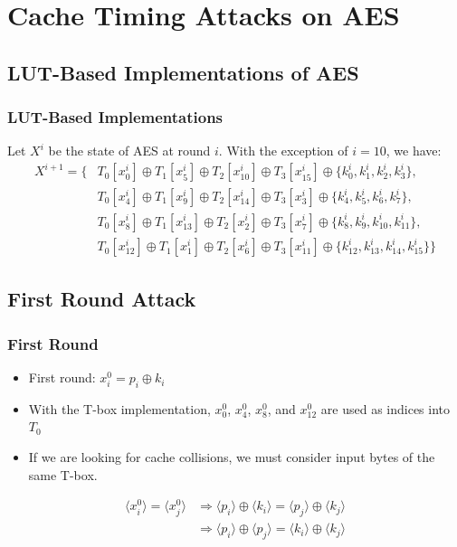 \documentclass[9pt,handout]{beamer}
\begin{document}
\section{Cache Timing Attacks on AES}
\subsection{LUT-Based Implementations of AES}
\begin{frame}
	\frametitle{LUT-Based Implementations}
	Let $X^i$ be the state of AES at round $i$. With the exception of $i = 10$, we have:
\begin{align*}
X^{i+1} = \{ & T_0[x_0^i] \oplus T_1[x_5^i] \oplus T_2[x_{10}^i] \oplus T_3[x_{15}^i] \oplus \{k_0^i, k_1^i, k_2^i, k_3^i\}, \\
& T_0[x_4^i] \oplus T_1[x_{9}^i] \oplus T_2[x_{14}^i] \oplus T_3[x_3^i] \oplus \{k_4^i, k_5^i, k_6^i, k_7^i\}, \\
& T_0[x_8^i] \oplus T_1[x_{13}^i] \oplus T_2[x_2^i] \oplus T_3[x_7^i] \oplus \{k_8^i, k_9^i, k_{10}^i, k_{11}^i\}, \\
& T_0[x_{12}^i] \oplus T_1[x_1^i] \oplus T_2[x_6^i] \oplus T_3[x_{11}^i] \oplus \{k_{12}^i, k_{13}^i, k_{14}^i, k_{15}^i\}\}
\end{align*}
\end{frame}

\subsection{First Round Attack}
\begin{frame}
	\frametitle{First Round}
	\begin{itemize}
		\item First round: $x_i^{0} = p_i \oplus k_i$
		\item With the T-box implementation, $x_0^0$, $x_4^0$, $x_8^0$, and $x_{12}^0$ are 
		used as indices into $T_0$
		\item If we are looking for cache collisions, we must consider input bytes of the same T-box.
	\end{itemize}
	\begin{align*}
		\langle x_i^0 \rangle = \langle x_j^0 \rangle & \Rightarrow \langle p_i \rangle \oplus \langle k_i \rangle = \langle p_j \rangle \oplus \langle k_j \rangle \\
		&  \Rightarrow \langle p_i \rangle \oplus \langle p_j \rangle = \langle k_i \rangle \oplus \langle k_j \rangle 
	\end{align*}
\end{frame}
\end{document}
